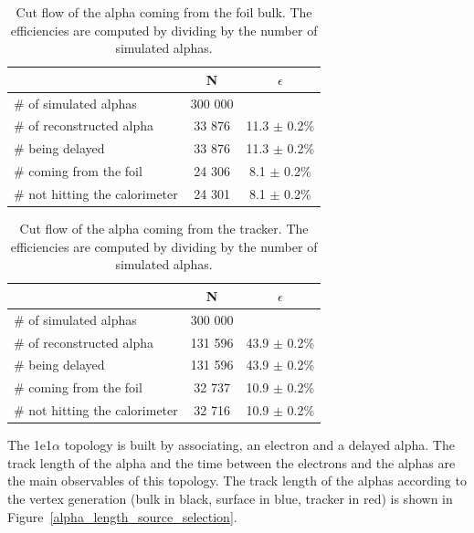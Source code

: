 \documentclass[main.tex]{subfiles}
\begin{document}
\begin{table}[h!]
\begin{center}
\begin{tabular}{l|c|c}
 & N & $\epsilon$ \\
\toprule
$\#$ of simulated alphas & 300 000 & \\
\hline
$\#$ of reconstructed alpha & 33 876 & 11.3 $\pm$ 0.2\% \\
$\#$ being delayed          & 33 876 & 11.3 $\pm$ 0.2\% \\
$\#$ coming from the foil   & 24 306 & 8.1  $\pm$ 0.2\% \\
$\#$ not hitting the calorimeter & 24 301 & 8.1  $\pm$ 0.2\% \\
\bottomrule
\end{tabular}
\end{center}
\caption{Cut flow of the alpha coming from the foil bulk. The efficiencies are computed by dividing by the number of simulated alphas.}
\label{Cutflowalphabulk}
\end{table}


\begin{table}[h!]
\begin{center}
\begin{tabular}{l|c|c}
 & N & $\epsilon$ \\
\toprule
$\#$ of simulated alphas & 300 000 & \\
\hline
$\#$ of reconstructed alpha & 131 596 & 43.9 $\pm$ 0.2\% \\
$\#$ being delayed          & 131 596 & 43.9 $\pm$ 0.2\% \\
$\#$ coming from the foil   & 32 737  & 10.9 $\pm$ 0.2\% \\
$\#$ not hitting the calorimeter & 32 716  & 10.9 $\pm$ 0.2\% \\
\bottomrule
\end{tabular}
\end{center}
\caption{Cut flow of the alpha coming from the tracker. The efficiencies are computed by dividing by the number of simulated alphas.}
\label{Cutflowalphatrackerselection}
\end{table}


\bigskip


\noindent The 1e1$\alpha$ topology is built by associating, an electron and a delayed alpha. The track length of the alpha and the time between the electrons and the alphas are the main observables of this topology. The track length of the alphas according to the vertex generation (bulk in black, surface in blue, tracker in red) is shown in Figure~\ref{alpha_length_source_selection}.
\end{document}

